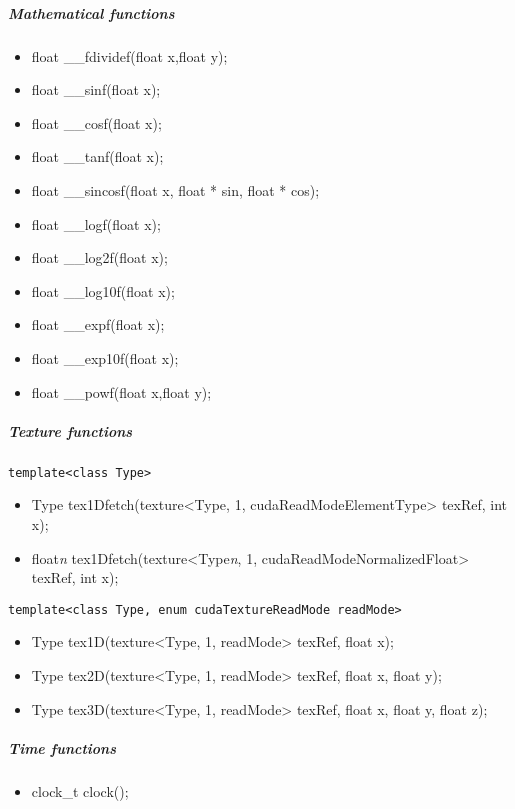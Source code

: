 					\subparagraph{Mathematical functions}
					
\begin{itemize}
	\item float \_\_fdividef(float x,float y);
	\item float \_\_sinf(float x);
	\item float \_\_cosf(float x);
	\item float \_\_tanf(float x);
	\item float \_\_sincosf(float x, float * sin, float * cos);
	\item float \_\_logf(float x);
	\item float \_\_log2f(float x);
	\item float \_\_log10f(float x);
	\item float \_\_expf(float x);
	\item float \_\_exp10f(float x);
	\item float \_\_powf(float x,float y);
\end{itemize}

					\subparagraph{Texture functions}
					
\begin{verbatim}template<class Type>\end{verbatim}
\begin{itemize}
	\item Type tex1Dfetch(texture<Type, 1, cudaReadModeElementType> texRef, int x);
	\item float\emph{n} tex1Dfetch(texture<Type\emph{n}, 1, cudaReadModeNormalizedFloat> texRef, int x);
\end{itemize}

\begin{verbatim}template<class Type, enum cudaTextureReadMode readMode>\end{verbatim}
\begin{itemize}
	\item Type tex1D(texture<Type, 1, readMode> texRef, float x);
	\item Type tex2D(texture<Type, 1, readMode> texRef, float x, float y);
	\item Type tex3D(texture<Type, 1, readMode> texRef, float x, float y, float z);
\end{itemize}

					\subparagraph{Time functions}

\begin{itemize}
	\item clock\_t clock();
\end{itemize}

